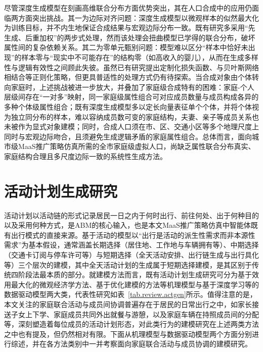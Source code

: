 尽管深度生成模型在刻画高维联合分布方面优势突出，其在人口合成中的应用仍面临两方面突出挑战\citep{laPopulationSynthesisProblembased2025,kimDeepGenerativeModel2023}。其一为边际对齐问题：深度生成模型以微观样本的似然最大化为训练目标，并不内生地保证合成结果与宏观边际分布一致。既有研究多采用``先生成、后重加权''的两步式处理，然而该处理会扭曲模型已学得的联合分布，破坏属性间的复杂依赖关系。其二为零单元甄别问题：模型难以区分``样本中恰好未出现''的样本零与``现实中不可能存在''的结构零（如高收入的婴儿），从而在生成多样性与逻辑有效性之间顾此失彼。虽然已有研究提出定制化损失函数\citep{kimDeepGenerativeModel2023}、与贝叶斯网络相结合\citep{huPopulationAlignedPersonaGeneration2025}等正则化策略，但更具普适性的处理方式仍有待探索\citep{laPopulationSynthesisProblembased2025}。当合成对象由个体转向家庭时，上述挑战被进一步放大，并叠加了家庭级合成特有的困难：家庭-个人层级间存在``一对多''映射，同一家庭级属性组合可对应成员数量与成员构成各异的多种个体级属性组合\citep{sunHierarchicalMixtureModeling2018}；既有深度生成模型多以定长向量表征单个个体，并将个体视为独立同分布的样本，难以容纳成员数可变的家庭结构，夫妻、亲子等成员关系也未被作为显式对象建模；同时，合成人口须在市、区、交通小区等多个地理尺度上同时与宏观边际吻合，且须避免生成逻辑矛盾的家庭属性组合。总体而言，面向城市级MaaS推广策略仿真所需的全市家庭级虚拟人口，尚缺乏属性联合分布真实、家庭结构合理且多尺度边际一致的系统性生成方法。

\section{活动计划生成研究}\label{sec.review.actgen}

活动计划以活动链的形式记录居民一日之内于何时出行、前往何处、出于何种目的以及采用何种方式\citep{castiglioneActivitybasedTravelDemand2015,liaoDeepActivityModel2024}，是ABM的核心输入，也是本文MaaS推广策略仿真中智能体既有出行模式的直接来源。基于活动的模型以``出行是活动的派生性需求而非本源性需求''为基本假设\citep{rasouliActivitybasedModelsTravel2014}，通常涵盖长期选择（居住地、工作地与车辆拥有等）、中期选择（交通卡订阅与停车许可等）与短期选择（全天活动安排、出行链生成与出行具化等）三个层次的建模\citep{castiglioneActivitybasedTravelDemand2015}，其中全天活动计划的生成属于短期选择建模，是其区别于传统四阶段法最本质的部分。就建模方法而言，既有活动计划生成研究可分为基于效用最大化的微观经济学方法、基于优化建模的方法等机理模型与基于深度学习等的数据驱动模型两大类，代表性研究如表~\ref{tab.review.actgen}所示。值得注意的是，本文关注的家庭联合活动与成员间协调普遍存在于居民的日常出行之中，如家长接送子女上下学、家庭成员共同外出就餐与游憩，以及家庭车辆在持照成员间的分配等，深刻塑造着每位成员的活动计划形态，对此类行为的建模研究在上述两类方法之中也有提及，但仍然相对有限。下面从机理模型与数据驱动模型两个方面分别进行综述，并在各方法类别中一并考察面向家庭联合活动与成员协调的建模研究。

